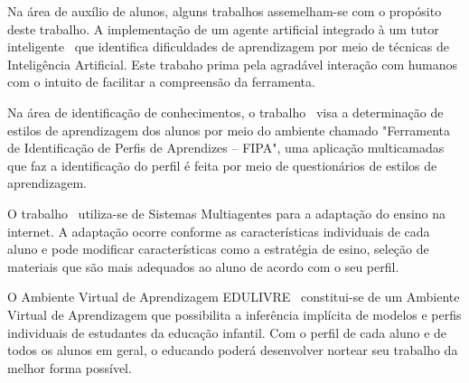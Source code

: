 Na área de auxílio de alunos, alguns trabalhos assemelham-se com o propósito deste trabalho. A implementação de um agente artificial integrado à um tutor inteligente~\cite{soaresagente} que identifica dificuldades de aprendizagem por meio de técnicas de Inteligência Artificial. Este trabaho prima pela agradável interação com humanos com o intuito de facilitar a compreensão da ferramenta.

Na área de identificação de conhecimentos, o trabalho~\cite{allen09} visa a determinação de estilos de aprendizagem dos alunos por meio do ambiente chamado "Ferramenta de Identificação de Perfis de Aprendizes – FIPA", uma aplicação multicamadas que faz a identificação do perfil é feita por meio de questionários de estilos de aprendizagem.
 
O trabalho~\cite{geyer2001semeai} utiliza-se de Sistemas Multiagentes para a adaptação do ensino na internet. A adaptação ocorre conforme as características individuais de cada aluno e pode modificar características como a estratégia de esino, seleção de materiais que são mais adequados ao aluno de acordo com o seu perfil.

O Ambiente Virtual de Aprendizagem EDULIVRE~\cite{rabelo2010identificacao} constitui-se de um Ambiente Virtual de Aprendizagem que possibilita a inferência implícita de modelos e perfis individuais de estudantes da educação infantil. Com o perfil de cada aluno e de todos os alunos em geral, o educando poderá desenvolver nortear seu trabalho da melhor forma possível.















